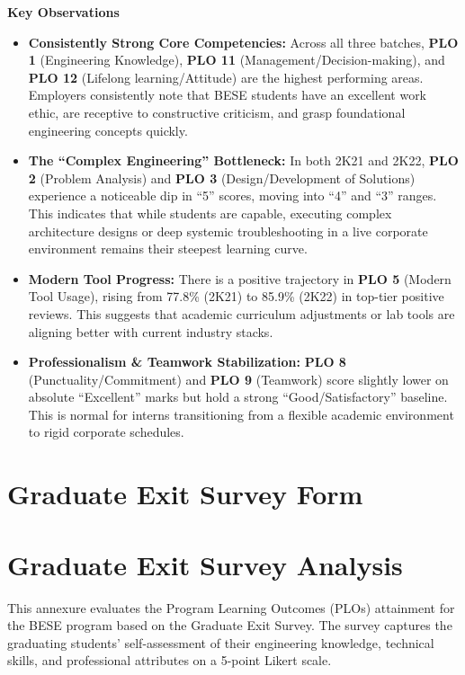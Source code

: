 {\textbf{Key Observations}

\begin{itemize}
\item \textbf{Consistently Strong Core Competencies:} Across all three batches, \textbf{PLO 1} (Engineering Knowledge), \textbf{PLO 11} (Management/Decision-making), and \textbf{PLO 12} (Lifelong learning/Attitude) are the highest performing areas. Employers consistently note that BESE students have an excellent work ethic, are receptive to constructive criticism, and grasp foundational engineering concepts quickly.
\item \textbf{The ``Complex Engineering'' Bottleneck:} In both 2K21 and 2K22, \textbf{PLO 2} (Problem Analysis) and \textbf{PLO 3} (Design/Development of Solutions) experience a noticeable dip in ``5'' scores, moving into ``4'' and ``3'' ranges. This indicates that while students are capable, executing complex architecture designs or deep systemic troubleshooting in a live corporate environment remains their steepest learning curve.
\item \textbf{Modern Tool Progress:} There is a positive trajectory in \textbf{PLO 5} (Modern Tool Usage), rising from 77.8\% (2K21) to 85.9\% (2K22) in top-tier positive reviews. This suggests that academic curriculum adjustments or lab tools are aligning better with current industry stacks.
\item \textbf{Professionalism \& Teamwork Stabilization:} \textbf{PLO 8} (Punctuality/Commitment) and \textbf{PLO 9} (Teamwork) score slightly lower on absolute ``Excellent'' marks but hold a strong ``Good/Satisfactory'' baseline. This is normal for interns transitioning from a flexible academic environment to rigid corporate schedules.
\end{itemize}

\section{Graduate Exit Survey Form}
\label{annex:graduate-exit-survey-form}


\clearpage
\section{Graduate Exit Survey Analysis}
\label{annex:graduate-exit-survey-analysis}

This annexure evaluates the Program Learning Outcomes (PLOs) attainment for the BESE program based on the Graduate Exit Survey. The survey captures the graduating students' self-assessment of their engineering knowledge, technical skills, and professional attributes on a 5-point Likert scale.

}
